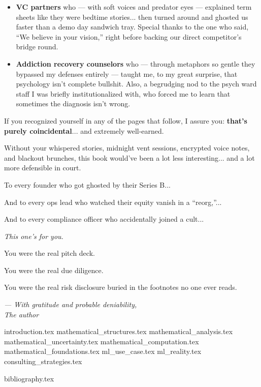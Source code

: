 \documentclass{article}
\begin{document}
\begin{itemize}
    \item \textbf{VC partners} who --- with soft voices and predator eyes --- explained term sheets 
    like they were bedtime stories...  
    then turned around and ghosted us faster than a demo day sandwich tray.  
    Special thanks to the one who said, ``We believe in your vision,''
    right before backing our direct competitor's bridge round.

    \item \textbf{Addiction recovery counselors} who --- through metaphors so gentle they bypassed my 
    defenses entirely --- taught me, to my great surprise, that psychology isn’t complete bullshit.  
    Also, a begrudging nod to the psych ward staff I was briefly institutionalized with,  
    who forced me to learn that sometimes the diagnosis isn’t wrong.
  \end{itemize}
  
  If you recognized yourself in any of the pages that follow, I assure you:  
  \textbf{that’s purely coincidental}... and extremely well-earned.

  Without your whispered stories, midnight vent sessions, encrypted voice notes, and blackout brunches,  
  this book would’ve been a lot less interesting... and a lot more defensible in court.

  To every founder who got ghosted by their Series B... 
  
  And to every ops lead who watched their equity vanish in a “reorg,”... 

  And to every compliance officer who accidentally joined a cult... 

  \textit{This one’s for you.}

  You were the real pitch deck.  

  You were the real due diligence.  

  You were the real risk disclosure buried in the footnotes no one ever reads.

  \begin{flushright}
  \textit{— With gratitude and probable deniability,}\\
  \textit{The author}
  \end{flushright}

  
  
  


  \tableofcontents

  \newpage


  {introduction.tex}
  {mathematical_structures.tex}
  {mathematical_analysis.tex}
  {mathematical_uncertainty.tex}
  {mathematical_computation.tex}
  {mathematical_foundations.tex}
  {ml_use_case.tex}
  {ml_reality.tex}
  {consulting_strategies.tex}

  {bibliography.tex}
\end{document}
